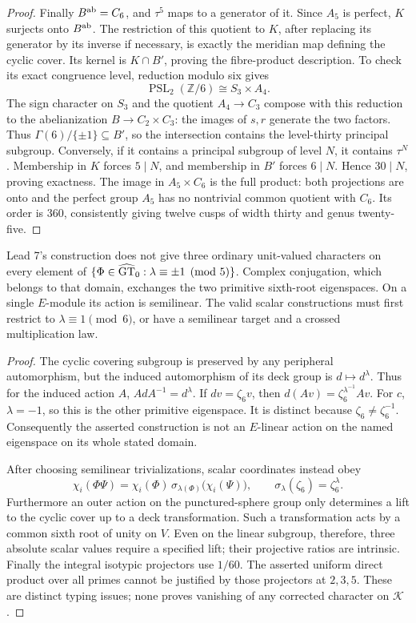 \begin{proof}
Finally \(B^{\rm ab}=C_6\), and \(\tau^5\) maps to a
generator of it. Since \(A_5\) is perfect, \(K\) surjects
onto \(B^{\rm ab}\). The restriction of this quotient to
\(K\), after replacing its generator by its inverse if
necessary, is exactly the meridian map defining the cyclic
cover. Its kernel is \(K\cap B'\), proving the fibre-product
description. To check its exact congruence level, reduction
modulo six gives
\[
 \operatorname{PSL}_2(\mathbb Z/6)
       \cong S_3\times A_4.
\]
The sign character on \(S_3\) and the quotient
\(A_4\to C_3\) compose with this reduction to the
abelianization \(B\to C_2\times C_3\): the images of
\(s,r\) generate the two factors. Thus
\(\Gamma(6)/\{\pm1\}\subseteq B'\), so the
intersection contains the level-thirty principal subgroup.
Conversely, if it contains a principal subgroup of level
\(N\), it contains \(\tau^N\). Membership in \(K\)
forces \(5\mid N\), and membership in \(B'\) forces
\(6\mid N\). Hence \(30\mid N\), proving exactness.
The image in \(A_5\times C_6\) is the full product:
both projections are onto and the perfect group \(A_5\)
has no nontrivial common quotient with \(C_6\).
Its order is \(360\), consistently giving twelve cusps
of width thirty and genus twenty-five.
\end{proof}

Lead 7's construction does not give three ordinary unit-valued
characters on every element of
\(\{\Phi\in\widehat{\mathrm{GT}}_0:\lambda\equiv\pm1\pmod5\}\).
Complex conjugation, which belongs to that domain, exchanges
the two primitive sixth-root eigenspaces. On a single
\(E\)-module its action is semilinear. The valid scalar
constructions must first restrict to \(\lambda\equiv1\pmod6\),
or have a semilinear target and a crossed multiplication law.
\begin{proof}
The cyclic covering subgroup is preserved by any peripheral
automorphism, but the induced automorphism of its deck group
is \(d\mapsto d^\lambda\). Thus for the induced action \(A\),
\(AdA^{-1}=d^\lambda\). If \(dv=\zeta_6v\), then
\(d(Av)=\zeta_6^{\lambda^{-1}}Av\). For \(c\),
\(\lambda=-1\), so this is the other primitive eigenspace.
It is distinct because \(\zeta_6\ne\zeta_6^{-1}\).
Consequently the asserted construction is not an \(E\)-linear
action on the named eigenspace on its whole stated domain.

After choosing semilinear trivializations, scalar coordinates
instead obey
\[
 \chi_i(\Phi\Psi)=\chi_i(\Phi)\,
       \sigma_{\lambda(\Phi)}\bigl(\chi_i(\Psi)\bigr),
 \qquad \sigma_\lambda(\zeta_6)=\zeta_6^\lambda.
\]
Furthermore an outer action on the punctured-sphere group
only determines a lift to the cyclic cover up to a deck
transformation. Such a transformation acts by a common sixth
root of unity on \(V\). Even on the linear subgroup, therefore,
three absolute scalar values require a specified lift; their
projective ratios are intrinsic. Finally the integral isotypic
projectors use \(1/60\). The asserted uniform direct product
over all primes cannot be justified by those projectors at
\(2,3,5\). These are distinct typing issues; none proves
vanishing of any corrected character on \(\mathcal K\).
\end{proof}

